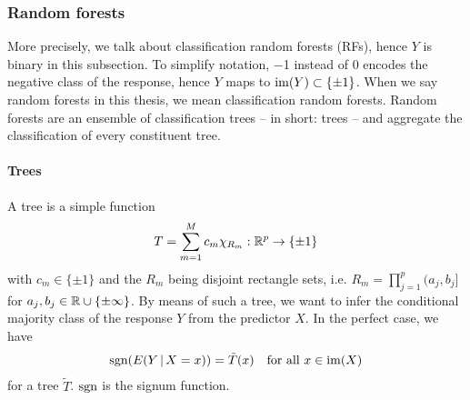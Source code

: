\subsubsection{Random forests}

More precisely, we talk about classification random forests (RFs), hence $Y$ is binary in this 
subsection. To simplify notation, \num{-1} instead of \num{0} encodes the negative class of 
the response, hence $Y$ maps to $\mathrm{im}(Y) \subset \{ \pm 1 \}$. When we say random 
forests in this thesis, we mean classification 
random forests. Random forests are an ensemble of classification trees -- in short: 
trees -- and aggregate the classification of every constituent tree.

\paragraph{Trees}
A tree is a simple function
\begin{align}
    T = \sum_{m=1}^M c_m \chi_{R_m}: \mathbb{R}^p \to \{ \pm 1 \}
\end{align}
with $c_m \in \{\pm 1\}$ and the $R_m$ being disjoint rectangle sets, i.e. $R_m = \prod_{j=1}^p 
(a_j, b_j]$ for $a_j, b_j \in \mathbb{R} \cup \{ \pm \infty \}$. By means of such a tree, we want to 
infer the conditional majority class of the response $Y$ from the predictor $X$. In the perfect 
case, we have
\begin{align}\label{eq:rf-major}
    \mathrm{sgn}(E(Y \,|\, X = x)) = \tilde{T}(x) \quad \text{for all } x \in \mathrm{im}(X)
\end{align}
for a tree $\tilde{T}$. $\mathrm{sgn}$ is the signum function.

